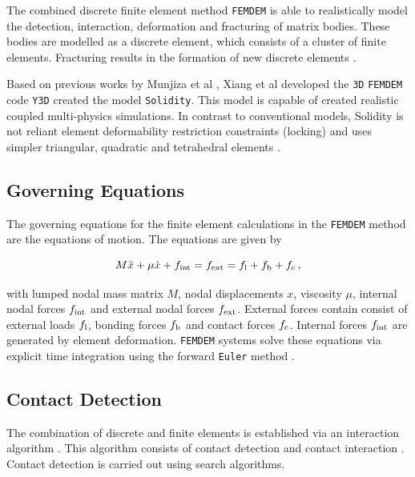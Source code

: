 \documentclass[format=acmtog,12pt,screen=true,review=false,natbib=false,]{acmart}
\begin{document}
\bigbreak
The combined discrete finite element method \texttt{FEMDEM} \cite{Wan18, Mun95, Mun99, Mun04, Mun12, Mun13, Guo16, Gao14, Xu14, Che18} is able to realistically model the detection, interaction, deformation and fracturing of matrix bodies. These bodies are modelled as a discrete element, which consists of a cluster of finite elements. Fracturing results in the formation of new discrete elements \cite{Mun13}.

\bigbreak
Based on previous works by Munjiza et al \cite{Mun95, Mun99, Mun04}, Xiang et al \cite{Xia09} developed the \texttt{3D} \texttt{FEMDEM} code \texttt{Y3D} created the model \texttt{Solidity}. This model is capable of created realistic coupled multi-physics simulations. In contrast to conventional models, Solidity is not reliant element deformability restriction constraints (locking) and uses simpler triangular, quadratic and tetrahedral elements \cite{Lat15}. 

\subsection{Governing Equations}

The governing equations for the finite element calculations in the \texttt{FEMDEM} method are the equations of motion. The equations are given by

\begin{equation}
    M\ddot{x}+\mu\dot{x}+f_{\rm{int}}=f_{\rm{ext}}=f_{\rm{l}}+f_{\rm{b}}+f_{\rm{c}}\,,
\end{equation}

with lumped nodal mass matrix $M$, nodal displacements $x$, viscosity $\mu$, internal nodal forces $f_{\rm{int}}$ and external nodal forces $f_{\rm{ext}}$. External forces contain consist of external loads $f_{\rm{l}}$, bonding forces $f_{\rm{b}}$ and contact forces $f_{\rm{c}}$. Internal forces $f_{\rm{int}}$ are generated by element deformation. \texttt{FEMDEM} systems solve these equations via explicit time integration using the forward \texttt{Euler} method \cite{Lei16}.

\subsection{Contact Detection}

The combination of discrete and finite elements is established via an interaction algorithm \cite{Lei16}. This algorithm consists of contact detection \cite{Che15} and contact interaction \cite{Mun13}. Contact detection is carried out using search algorithms. 
\end{document}
